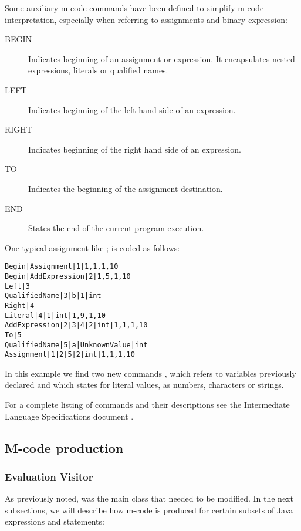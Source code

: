 Some auxiliary {m-code} commands have been defined to simplify m-code interpretation, especially when referring to assignments and binary expression:

\begin{description}

	\item[BEGIN] Indicates beginning of an assignment or expression. It encapsulates nested expressions, literals or qualified names.
	
	\item[LEFT] Indicates beginning of the left hand side of an expression.
	
	\item[RIGHT] Indicates beginning of the right hand side of an expression.
	
	\item[TO] Indicates the beginning of the assignment destination.
	
	\item[END]  States the end of the current program execution.
	
\end{description}

One typical assignment like ; is coded as follows:

\begin{verbatim}
Begin|Assignment|1|1,1,1,10
Begin|AddExpression|2|1,5,1,10
Left|3
QualifiedName|3|b|1|int
Right|4
Literal|4|1|int|1,9,1,10
AddExpression|2|3|4|2|int|1,1,1,10
To|5
QualifiedName|5|a|UnknownValue|int
Assignment|1|2|5|2|int|1,1,1,10
\end{verbatim}

In this example we find two new commands , which refers to variables previously declared and  which states for literal values, as numbers, characters or strings.

For a complete listing of commands and their descriptions see the Intermediate Language Specifications document \citep{Moreno2004}. 

\subsection{M-code production}

\subsubsection{Evaluation Visitor}

As previously noted,  was the main class that needed to be modified. In the next subsections, we will describe how {m-code} is produced for certain subsets of Java expressions and statements:

